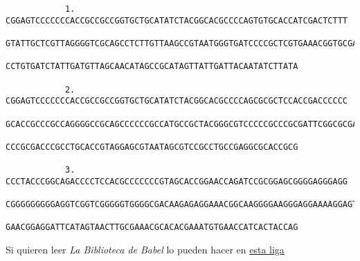 \documentclass[letter]{article}
\begin{document}
\begin{enumerate}
\begin{verbatim}
            1. CGGAGTCCCCCCCACCGCCGCCGGTGCTGCATATCTACGGCACGCCCCAGTGTGCACCATCGACTCTTT
            GTATTGCTCGTTAGGGGTCGCAGCCTCTTGTTAAGCCGTAATGGGTGATCCCCGCTCGTGAAACGGTGCGAT
            CCTGTGATCTATTGATGTTAGCAACATAGCCGCATAGTTATTGATTACAATATCTTATA
            
            2. CGGAGTCCCCCCCACCGCCGCCGGTGCTGCATATCTACGGCACGCCCCAGCGCGCTCCACCGACCCCCC
            GCACCGCCCGCCAGGGGCCGCAGCCCCCCGCCATGCCGCTACGGGCGTCCCCCGCCCGCGATTCGGCGCGAC
            CCCGCGACCCGCCTGCACCGTAGGAGCGTAATAGCGTCCGCCTGCCGAGGCGCACCGCG
            
            3. CCCTACCCGGCAGACCCCTCCACGCCCCCCCGTAGCACCGGAACCAGATCCGCGGAGCGGGGAGGGAGG
            CGGGGGGGGGAGGTCGGTCGGGGGTGGGGCGACAAGAGAGGAAACGGCAAGGGGAAGGGAGGAAAAGGAGTG
            GAACGGAGGATTCATAGTAACTTGCGAAACGCACACGAAATGTGAACCATCACTACCAG
        \end{verbatim}
    \end{enumerate}

Si quieren leer {\emph{La Biblioteca de Babel}} lo pueden hacer en \href {https://www.ingenieria.unam.mx/dcsyhfi/material_didactico/Literatura_Hispanoamericana_Contemporanea/Autores_B/BORGES/Babel.pdf}{esta liga}
\end{document}
